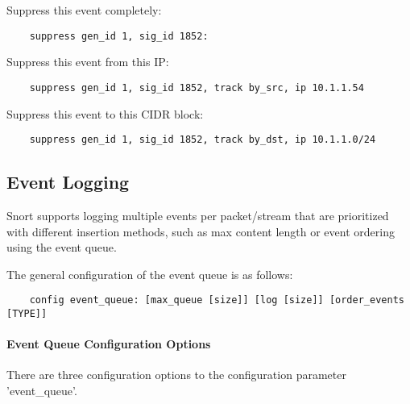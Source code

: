 \documentclass[english]{report}
\begin{document}
Suppress this event completely:

\begin{verbatim}
    suppress gen_id 1, sig_id 1852:
\end{verbatim}

Suppress this event from this IP:

\begin{verbatim}
    suppress gen_id 1, sig_id 1852, track by_src, ip 10.1.1.54
\end{verbatim}

Suppress this event to this CIDR block:

\begin{verbatim}
    suppress gen_id 1, sig_id 1852, track by_dst, ip 10.1.1.0/24
\end{verbatim}

\subsection{Event Logging}
\label{eventqueue}

Snort supports logging multiple events per packet/stream that are prioritized
with different insertion methods, such as max content length or event ordering
using the event queue.

The general configuration of the event queue is as follows:

\begin{verbatim}
    config event_queue: [max_queue [size]] [log [size]] [order_events [TYPE]]
\end{verbatim}

\paragraph{Event Queue Configuration Options}

There are three configuration options to the configuration parameter
'event\_queue'.
\end{document}
